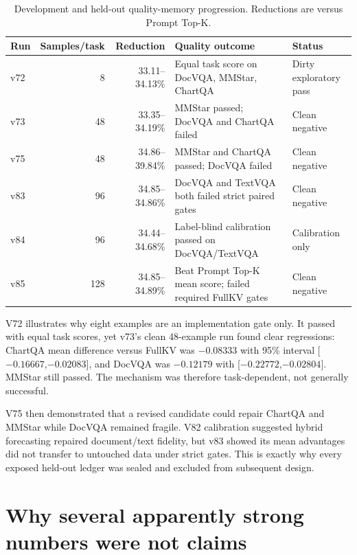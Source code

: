 \documentclass[11pt]{article}
\begin{document}
\begin{table}[ht]
\centering
\small
\caption{Development and held-out quality-memory progression.  Reductions are versus Prompt Top-K.}
\label{tab:heldout}
\begin{tabularx}{\linewidth}{lrrXl}
\toprule
Run & Samples/task & Reduction & Quality outcome & Status \\
\midrule
v72 & 8 & 33.11--34.13\% & Equal task score on DocVQA, MMStar, ChartQA & Dirty exploratory pass \\
v73 & 48 & 33.35--34.19\% & MMStar passed; DocVQA and ChartQA failed & Clean negative \\
v75 & 48 & 34.86--39.84\% & MMStar and ChartQA passed; DocVQA failed & Clean negative \\
v83 & 96 & 34.85--34.86\% & DocVQA and TextVQA both failed strict paired gates & Clean negative \\
v84 & 96 & 34.44--34.68\% & Label-blind calibration passed on DocVQA/TextVQA & Calibration only \\
v85 & 128 & 34.85--34.89\% & Beat Prompt Top-K mean score; failed required FullKV gates & Clean negative \\
\bottomrule
\end{tabularx}
\end{table}

V72 illustrates why eight examples are an implementation gate only.  It passed with equal task
scores, yet v73's clean 48-example run found clear regressions: ChartQA mean difference versus
FullKV was $-0.08333$ with 95\% interval [$-0.16667$,$-0.02083$], and DocVQA was $-0.12179$ with
[$-0.22772$,$-0.02804$].  MMStar still passed.  The mechanism was therefore task-dependent, not
generally successful.

V75 then demonstrated that a revised candidate could repair ChartQA and MMStar while DocVQA
remained fragile.  V82 calibration suggested hybrid forecasting repaired document/text fidelity,
but v83 showed its mean advantages did not transfer to untouched data under strict gates.  This is
exactly why every exposed held-out ledger was sealed and excluded from subsequent design.

\section{Why several apparently strong numbers were not claims}
\end{document}
